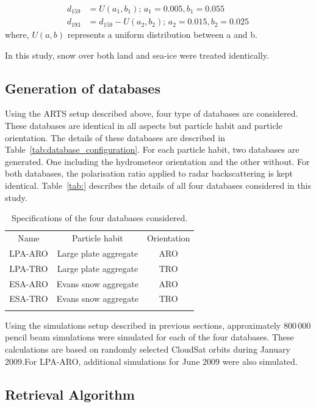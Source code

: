 \documentclass[amt, manuscript]{copernicus}
\begin{document}
\begin{align}
d_{159}& = U(a_1, b_1) ;\, a_1 = 0.005, b_1 = 0.055\\
d_{193}& = d_{159} - U(a_2, b_2) ;\, a_2 = 0.015, b_2 = 0.025 \,
\end{align}
where, $U(a, b)$ represents a uniform distribution between a and b. 

In this study, snow over both land and sea-ice were treated identically. 

\subsection{Generation of databases}
\label{sec:database}

Using the ARTS setup described above, four type of databases are considered. These databases are identical in all aspects but particle habit and particle orientation. The details of these databases are described in Table~\ref{tab:database_configuration}. For each particle habit, two databases are generated. One including the hydrometeor orientation and the other without. For both databases, the polarisation ratio applied to radar backscattering is kept identical. Table~\ref{tab:} describes the details of all four databases considered in this study.

\begin{table}[t]
	\caption{Specifications of the four databases considered.}
	\label{tab:specs_database}	
	\begin{tabular}{ccc}
		\tophline
		Name & Particle habit 	& Orientation  \\
		\middlehline
		LPA-ARO & Large plate aggregate & ARO\\
		LPA-TRO & Large plate aggregate & TRO\\
		ESA-ARO & Evans snow aggregate  & ARO\\
	    ESA-TRO & Evans snow aggregate  & TRO\\
		\bottomhline
	\end{tabular}
	\belowtable{} %
\end{table}

Using the simulations setup described in previous sections, approximately 800\,000 pencil beam simulations were simulated for each of the four databases. These calculations are based on randomly selected CloudSat orbits during January 2009.For LPA-ARO, additional simulations for June 2009 were also simulated.


\subsection{Retrieval Algorithm}
\label{sec:retrieval_algo}
\end{document}
